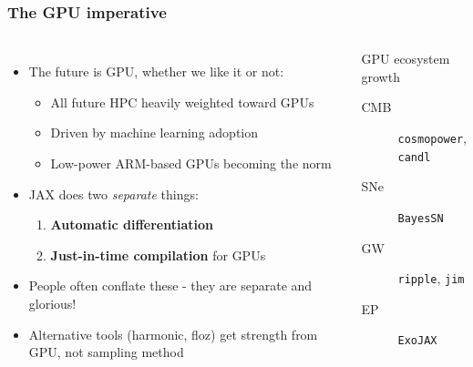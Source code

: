 \documentclass[aspectratio=169]{beamer}
\begin{document}
\begin{frame}
    \frametitle{The GPU imperative}
    \begin{columns}
        \begin{itemize}
            \item The future is GPU, whether we like it or not:
                \begin{itemize}
                    \item All future HPC heavily weighted toward GPUs
                    \item Driven by machine learning adoption
                    \item Low-power ARM-based GPUs becoming the norm
                \end{itemize}
            \item JAX does two \emph{separate} things:
                \begin{enumerate}
                    \item \textbf{Automatic differentiation}
                    \item \textbf{Just-in-time compilation} for GPUs
                \end{enumerate}
            \item People often conflate these - they are separate and glorious!
            \item Alternative tools (harmonic, floz) get strength from GPU, not sampling method
        \end{itemize}
        \begin{block}{GPU ecosystem growth}
            \begin{description}
                \item[CMB] \texttt{cosmopower}, \texttt{candl}
                \item[SNe] \texttt{BayesSN}
                \item[GW] \texttt{ripple}, \texttt{jim}
                \item[EP] \texttt{ExoJAX}
            \end{description}
        \end{block}
    \end{columns}
\end{frame}
\end{document}
